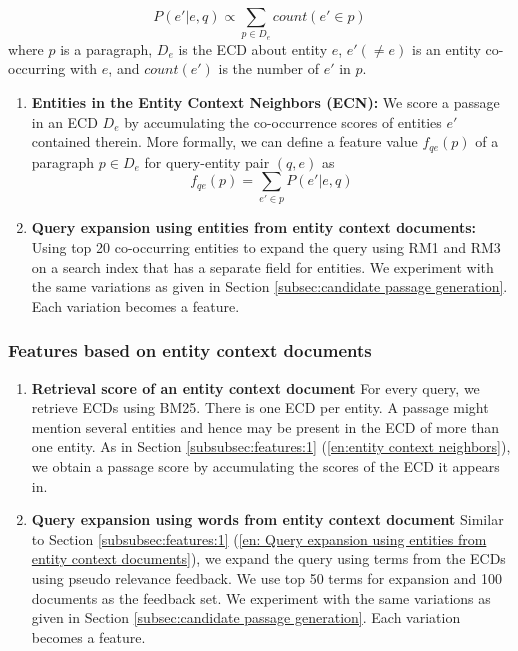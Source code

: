 \documentclass[sigconf]{acmart}
\begin{document}
\begin{equation}
\label{eq:1}
    P(e'|e,q) \propto \sum_{p \in D_e} count(e'\in p)
\end{equation}
where $p$ is a paragraph, $D_e$ is the ECD about entity $e$, $e' (\ne e)$ is an entity co-occurring with $e$, and $count(e')$ is the number of $e'$ in $p$. 

\begin{enumerate}
    \item \textbf{Entities in the Entity Context Neighbors (ECN):} \label{en:entity context neighbors} We score a passage in an ECD $D_e$ by accumulating the co-occurrence scores of entities $e'$ contained therein. 
More formally, we can define a feature value $f_{qe}(p)$ of a paragraph $p \in D_e$ for query-entity pair $(q, e)$ as
\begin{equation}
\label{eq:2}
    f_{qe}(p) = \sum_{e' \in p} P(e'|e,q)
\end{equation}
\item \textbf{Query expansion using entities from entity context documents:} \label{en: Query expansion using entities from entity context documents} Using top 20 co-occurring entities to expand the query using RM1 and RM3 on a search index that has a separate field for entities. We experiment with the same variations as given in Section \ref{subsec:candidate passage generation}. Each variation becomes a feature.
\end{enumerate}
\subsubsection{Features based on entity context documents}
\label{subsubsec:feature:2}
\begin{enumerate}
    \item \textbf{Retrieval score of an entity context document} \label{en:Retrieval score of a entity context document}For every query, we retrieve ECDs using BM25. There is one ECD per entity. A passage might mention several entities and hence may be present in the ECD of more than one entity. 
    As in Section \ref{subsubsec:features:1} (\ref{en:entity context neighbors}), we obtain a passage score by accumulating the scores of the ECD it appears in. 

    \item \textbf{Query expansion using words from entity context document} \label{en:Query expansion using words from entity context document} Similar to Section \ref{subsubsec:features:1} (\ref{en: Query expansion using entities from entity context documents}), we expand the query using terms from the ECDs using pseudo relevance feedback. We use top 50 terms for expansion and 100 documents as the feedback set. We experiment with the same variations as given in Section \ref{subsec:candidate passage generation}. Each variation becomes a feature.
\end{enumerate}
\end{document}

